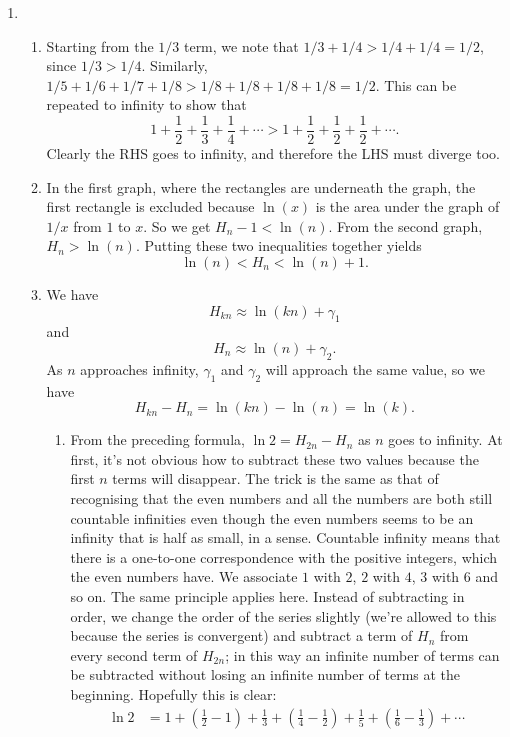 \documentclass[a4paper,10pt]{article}
\begin{document}
\begin{enumerate}
\begin{enumerate}
\end{enumerate}
\item
  \begin{enumerate}
  \item Starting from the \(1/3\) term, we note that \(1/3+1/4>1/4+1/4=1/2\), since \(1/3>1/4\). Similarly,
    \(1/5+1/6+1/7+1/8>1/8+1/8+1/8+1/8=1/2.\) This can be repeated to infinity to show that
    \[1+\frac{1}{2}+\frac{1}{3}+\frac{1}{4}+\cdots>1+\frac{1}{2}+\frac{1}{2}+\frac{1}{2}+\cdots.\]
    Clearly the RHS goes to infinity, and therefore the LHS must diverge too.
  \item In the first graph, where the rectangles are underneath the graph, the first rectangle is excluded
    because \(\ln(x)\) is the area under the graph of \(1/x\) from \(1\) to \(x\). So we get \(H_n-1<\ln(n)\).
    From the second graph, \(H_n>\ln(n)\). Putting these two inequalities together yields \[\ln(n)<H_n<\ln(n)+1.\]
  \item We have \[H_{kn}\approx\ln(kn)+\gamma_1\] and \[H_{n}\approx\ln(n)+\gamma_2.\]
    As \(n\) approaches infinity, \(\gamma_1\) and \(\gamma_2\) will approach the same value, so we have
    \[H_{kn}-H_{n}=\ln(kn)-\ln(n)=\ln(k).\]
    \begin{enumerate}
    \item From the preceding formula, \(\ln2=H_{2n}-H_{n}\) as \(n\) goes to infinity. At first, it's not obvious
      how to subtract these two values because the first \(n\) terms will disappear. The trick is the same as
      that of recognising that the even numbers and all the numbers are both still countable infinities even
      though the even numbers seems to be an infinity that is half as small, in a sense. Countable infinity
      means that there is a one-to-one correspondence with the positive integers, which the even numbers have.
      We associate \(1\) with \(2\), \(2\) with \(4\), \(3\) with \(6\) and so on. The same principle applies
      here. Instead of subtracting in order, we change the order of the series slightly (we're allowed to this
      because the series is convergent) and subtract a term of \(H_n\) from every second term of \(H_{2n}\); in this
      way an infinite number of terms can be subtracted without losing an infinite  number of terms at the beginning.
      Hopefully this is clear:
      \[
        \begin{split}
          \ln2&=1+\left(\frac{1}{2}-1\right)+\frac{1}{3}+\left(\frac{1}{4}-\frac{1}{2}\right)+\frac{1}{5}+\left(\frac{1}{6}-\frac{1}{3}\right)+\cdots\\

\end{split}\]
\end{enumerate}
\end{enumerate}
\end{enumerate}
\end{document}

